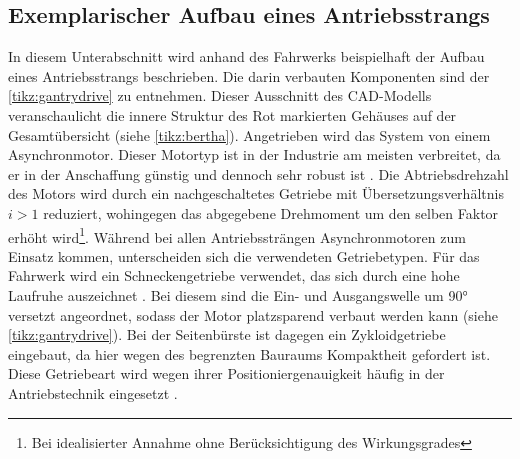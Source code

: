 \subsection{Exemplarischer Aufbau eines Antriebsstrangs}
In diesem Unterabschnitt wird anhand des Fahrwerks beispielhaft der Aufbau eines Antriebsstrangs beschrieben. Die darin verbauten Komponenten sind der  \autoref{tikz:gantrydrive} zu entnehmen. Dieser Ausschnitt des CAD-Modells veranschaulicht die innere Struktur des Rot markierten Gehäuses auf der Gesamtübersicht (siehe  \autoref{tikz:bertha}). Angetrieben wird das System von einem Asynchronmotor. Dieser Motortyp ist in der Industrie am meisten verbreitet, da er in der Anschaffung günstig und dennoch sehr robust ist \cite{advanced_speed_control} \cite{electrical_drives}. Die Abtriebsdrehzahl des Motors wird durch ein nachgeschaltetes Getriebe mit Übersetzungsverhältnis $i>1$ reduziert, wohingegen das abgegebene Drehmoment um den selben Faktor erhöht wird\footnote{Bei idealisierter Annahme ohne Berücksichtigung des Wirkungsgrades}. Während bei allen Antriebssträngen Asynchronmotoren zum Einsatz kommen, unterscheiden sich die verwendeten Getriebetypen. Für das Fahrwerk wird ein Schneckengetriebe verwendet, das sich durch eine hohe Laufruhe auszeichnet \cite{tabellenbuch_metall}. Bei diesem sind die Ein- und Ausgangswelle um 90° versetzt angeordnet, sodass der Motor platzsparend verbaut werden kann (siehe  \autoref{tikz:gantrydrive}). Bei der Seitenbürste ist dagegen ein Zykloidgetriebe eingebaut, da hier wegen des begrenzten Bauraums Kompaktheit gefordert ist. Diese Getriebeart wird wegen ihrer Positioniergenauigkeit häufig in der Antriebstechnik eingesetzt \cite{zykliodgetriebe}.

